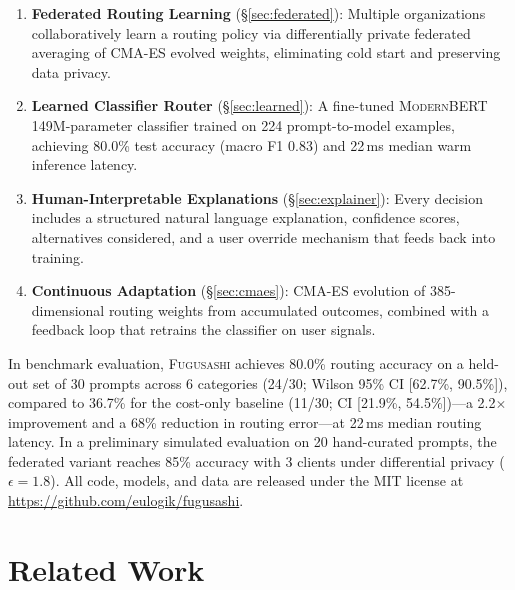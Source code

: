 \documentclass[11pt,a4paper]{article}
\newcommand{\fugusashi}{\textsc{Fugusashi}}
\newcommand{\modernbert}{\textsc{ModernBERT}}
\begin{document}
\begin{enumerate}[leftmargin=*]
    \item \textbf{Federated Routing Learning} (\S\ref{sec:federated}): Multiple organizations collaboratively learn a routing policy via differentially private federated averaging of CMA-ES evolved weights, eliminating cold start and preserving data privacy.
    \item \textbf{Learned Classifier Router} (\S\ref{sec:learned}): A fine-tuned \modernbert{} 149M-parameter classifier trained on 224 prompt-to-model examples, achieving 80.0\% test accuracy (macro F1 0.83) and 22\,ms median warm inference latency.
    \item \textbf{Human-Interpretable Explanations} (\S\ref{sec:explainer}): Every decision includes a structured natural language explanation, confidence scores, alternatives considered, and a user override mechanism that feeds back into training.
    \item \textbf{Continuous Adaptation} (\S\ref{sec:cmaes}): CMA-ES evolution of 385-dimensional routing weights from accumulated outcomes, combined with a feedback loop that retrains the classifier on user signals.
\end{enumerate}

In benchmark evaluation, \fugusashi{} achieves 80.0\% routing accuracy on a held-out set of 30 prompts across 6 categories (24/30; Wilson 95\% CI [62.7\%, 90.5\%]), compared to 36.7\% for the cost-only baseline (11/30; CI [21.9\%, 54.5\%])---a 2.2$\times$ improvement and a 68\% reduction in routing error---at 22\,ms median routing latency.
In a preliminary simulated evaluation on 20 hand-curated prompts, the federated variant reaches 85\% accuracy with 3 clients under differential privacy ($\epsilon = 1.8$).
All code, models, and data are released under the MIT license at \url{https://github.com/eulogik/fugusashi}.

\section{Related Work}
\end{document}
